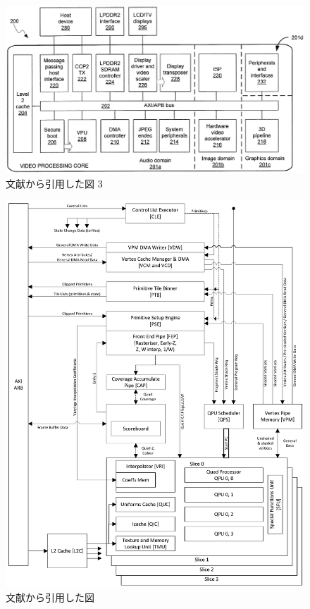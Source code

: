 \documentclass{jsarticle}
\begin{document}
\begin{figure}
\includegraphics[width=\textwidth]{vc-fig2.png}
\caption{文献\cite{vc-patent}から引用した図 3}
\label{pic:vc-fig2}
\end{figure}

\begin{figure}
\includegraphics[width=\textwidth]{vc-vc.png}
\caption{文献\cite{vc-manual}から引用した図}
\label{pic:vc-vc}
\end{figure}
\end{document}

